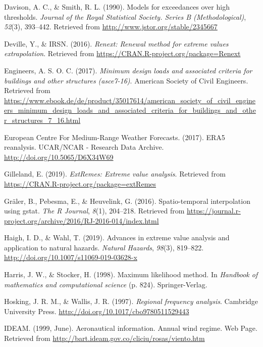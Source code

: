 \documentclass[12pt,oneside]{reedthesis}
\begin{document}
\leavevmode\hypertarget{ref-Davison1990}{}%
Davison, A. C., \& Smith, R. L. (1990). Models for exceedances over high thresholds. \emph{Journal of the Royal Statistical Society. Series B (Methodological)}, \emph{52}(3), 393--442. Retrieved from \url{http://www.jstor.org/stable/2345667}

\leavevmode\hypertarget{ref-Deville2016}{}%
Deville, Y., \& IRSN. (2016). \emph{Renext: Renewal method for extreme values extrapolation}. Retrieved from \url{https://CRAN.R-project.org/package=Renext}

\leavevmode\hypertarget{ref-Asce2017}{}%
Engineers, A. S. O. C. (2017). \emph{Minimum design loads and associated criteria for buildings and other structures (asce7-16)}. American Society of Civil Engineers. Retrieved from \url{https://www.ebook.de/de/product/35017614/american_society_of_civil_engineers_minimum_design_loads_and_associated_criteria_for_buildings_and_other_structures_7_16.html}

\leavevmode\hypertarget{ref-ECFMRWF2017}{}%
European Centre For Medium-Range Weather Forecasts. (2017). ERA5 reanalysis. UCAR/NCAR - Research Data Archive. \url{http://doi.org/10.5065/D6X34W69}

\leavevmode\hypertarget{ref-Gilleland2019}{}%
Gilleland, E. (2019). \emph{ExtRemes: Extreme value analysis}. Retrieved from \url{https://CRAN.R-project.org/package=extRemes}

\leavevmode\hypertarget{ref-Graeler2016}{}%
Gräler, B., Pebesma, E., \& Heuvelink, G. (2016). Spatio-temporal interpolation using gstat. \emph{The R Journal}, \emph{8}(1), 204--218. Retrieved from \url{https://journal.r-project.org/archive/2016/RJ-2016-014/index.html}

\leavevmode\hypertarget{ref-Haigh2019}{}%
Haigh, I. D., \& Wahl, T. (2019). Advances in extreme value analysis and application to natural hazards. \emph{Natural Hazards}, \emph{98}(3), 819--822. \url{http://doi.org/10.1007/s11069-019-03628-x}

\leavevmode\hypertarget{ref-Harris1994}{}%
Harris, J. W., \& Stocker, H. (1998). Maximum likelihood method. In \emph{Handbook of mathematics and computational science} (p. 824). Springer-Verlag.

\leavevmode\hypertarget{ref-Hosking1997}{}%
Hosking, J. R. M., \& Wallis, J. R. (1997). \emph{Regional frequency analysis}. Cambridge University Press. \url{http://doi.org/10.1017/cbo9780511529443}

\leavevmode\hypertarget{ref-ideam1999}{}%
IDEAM. (1999, June). Aeronautical information. Annual wind regime. Web Page. Retrieved from \url{http://bart.ideam.gov.co/cliciu/rosas/viento.htm}
\end{document}
